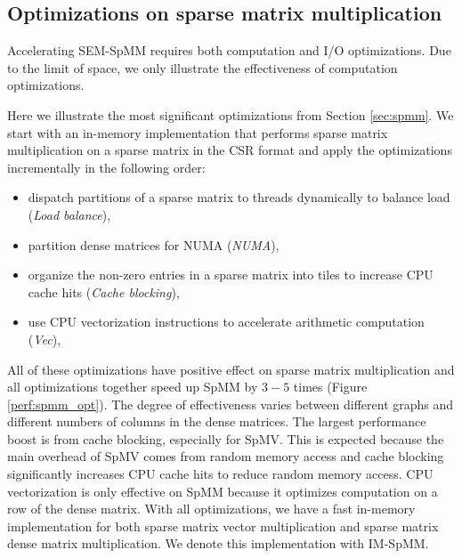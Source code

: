 \subsection{Optimizations on sparse matrix multiplication}
Accelerating SEM-SpMM requires both computation and I/O optimizations. Due to
the limit of space, we only illustrate the effectiveness of computation
optimizations.

Here we illustrate the most significant optimizations from Section
\ref{sec:spmm}. We start with an in-memory implementation that
performs sparse matrix multiplication on a sparse matrix in the CSR format
and apply the optimizations incrementally in the following order:
\begin{itemize} \itemsep1pt \parskip0pt 
	\item dispatch partitions of a sparse matrix to threads dynamically
		to balance load (\textit{Load balance}),
	\item partition dense matrices for NUMA (\textit{NUMA}),
	\item organize the non-zero entries in a sparse matrix into tiles to
		increase CPU cache hits (\textit{Cache blocking}),
	\item use CPU vectorization instructions to accelerate arithmetic
		computation (\textit{Vec}),
\end{itemize}

All of these optimizations have positive effect on sparse matrix
multiplication and all optimizations together speed up SpMM by $3-5$ times
(Figure \ref{perf:spmm_opt}). The degree of effectiveness
varies between different graphs and different numbers of columns in
the dense matrices. The largest performance boost is from cache blocking,
especially for SpMV.
This is expected because the main overhead of SpMV comes from random memory
access and cache blocking significantly increases CPU cache hits to reduce
random memory access. CPU vectorization is only effective on SpMM because
it optimizes computation on a row of the dense matrix.
With all optimizations, we have a fast in-memory implementation for both
sparse matrix vector multiplication and sparse matrix dense matrix multiplication.
We denote this implementation with IM-SpMM.

